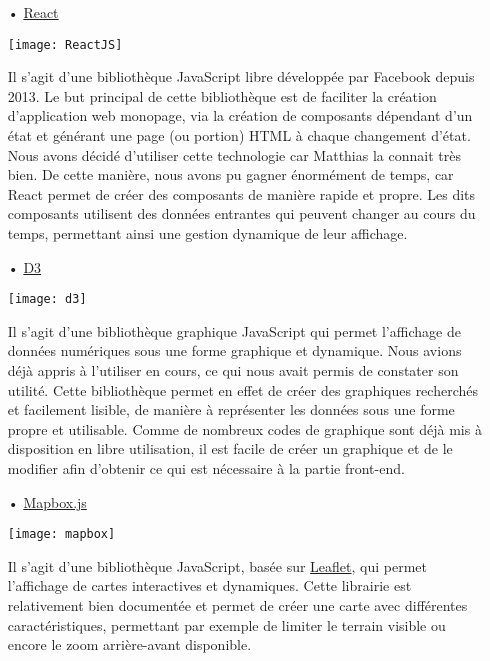 \begin{itemize}
\item[•] \href{https://reactjs.org/}{React}

\begin{center}
\texttt{[image: ReactJS]}
\end{center}
\vspace{5mm}

Il s'agit d'une bibliothèque JavaScript libre développée par Facebook depuis 2013. Le but principal de cette bibliothèque est de faciliter la création d'application web monopage, via la création de composants dépendant d'un état et générant une page (ou portion) HTML à chaque changement d'état. Nous avons décidé d'utiliser cette technologie car Matthias la connait très bien. De cette manière, nous avons pu gagner énormément de temps, car React permet de créer des composants de manière rapide et propre. Les dits composants utilisent des données entrantes qui peuvent changer au cours du temps, permettant ainsi une gestion dynamique de leur affichage. 
\vspace{5mm}

\item[•] \href{https://d3js.org/}{D3}

\begin{center}
\texttt{[image: d3]}
\end{center}
\vspace{5mm}

Il s'agit d'une bibliothèque graphique JavaScript qui permet l'affichage de données numériques sous une forme graphique et dynamique. Nous avions déjà appris à l'utiliser en cours, ce qui nous avait permis de constater son utilité. Cette bibliothèque permet en effet de créer des graphiques recherchés et facilement lisible, de manière à représenter les données sous une forme propre et utilisable. Comme de nombreux codes de graphique sont déjà mis à disposition en libre utilisation, il est facile de créer un graphique et de le modifier afin d'obtenir ce qui est nécessaire à la partie front-end. 
\vspace{5mm}

\item[•] \href{https://www.mapbox.com/mapbox.js/api/v3.1.1/}{Mapbox.js}

\begin{center}
\texttt{[image: mapbox]}
\end{center}
\vspace{5mm}

Il s'agit d'une bibliothèque JavaScript, basée sur \href{https://leafletjs.com/}{Leaflet}, qui permet l'affichage de cartes interactives et dynamiques. Cette librairie est relativement bien documentée et permet de créer une carte avec différentes caractéristiques, permettant par exemple de limiter le terrain visible ou encore le zoom arrière-avant disponible.
\end{itemize}

